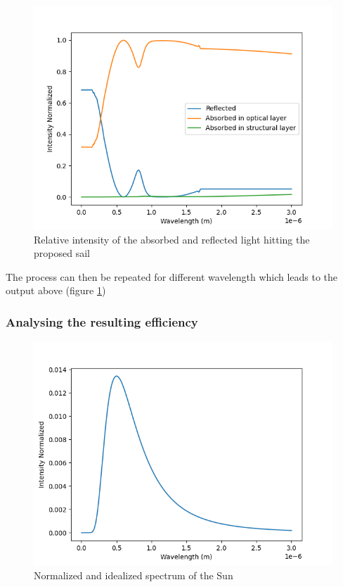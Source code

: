 \documentclass[14pt]{article}
\begin{document}
\begin{figure}[H]
  \centering
  \includegraphics[width=14cm]{./python/output/reflection_and_absorption_aluminum_sail.png}
  \caption{Relative intensity of the absorbed and reflected light hitting the proposed sail}
  \label{fig:aluminum_sail}
\end{figure}

The process can then be repeated for different wavelength which leads to the output above (figure \ref{fig:aluminum_sail})

\subsubsection{Analysing the resulting efficiency}

\begin{figure}[H]
  \centering
  \includegraphics[width=14cm]{./python/output/blackbody_radiation_Sun.png}
  \caption{Normalized and idealized spectrum of the Sun}
  \label{fig:spectrum_Sun}
\end{figure}
\end{document}
